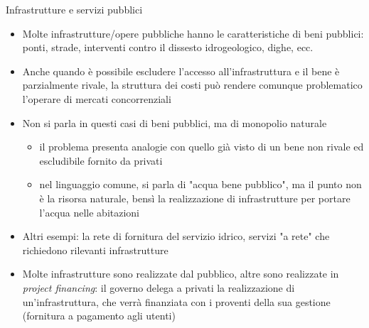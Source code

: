 \documentclass[aspectratio=149,11pt]{beamer}
\begin{document}
\begin{frame}{Infrastrutture e servizi pubblici}
\begin{itemize}
\item Molte infrastrutture/opere pubbliche hanno le caratteristiche di beni
pubblici: ponti, strade, interventi contro il dissesto idrogeologico, dighe,
ecc.
\item Anche quando è possibile escludere l'accesso all'infrastruttura e il bene è
parzialmente rivale, la struttura dei costi può rendere comunque problematico
l'operare di mercati concorrenziali
\item Non si parla in questi casi di beni pubblici, ma di \alert{monopolio naturale}
\begin{itemize}
\item il problema presenta analogie con quello già visto di un bene non rivale
ed escludibile fornito da privati
\item nel linguaggio comune, si parla di "acqua bene pubblico", ma il punto non
è la risorsa naturale, bensì la realizzazione di infrastrutture per
portare l'acqua nelle abitazioni
\end{itemize}
\item Altri esempi: la rete di fornitura del servizio idrico, servizi "a rete" che
richiedono rilevanti infrastrutture
\item Molte infrastrutture sono realizzate dal pubblico, altre sono realizzate in
\emph{project financing}: il governo delega a privati la realizzazione di
un'infrastruttura, che verrà finanziata con i proventi della sua gestione
(fornitura a pagamento agli utenti)
\end{itemize}
\end{frame}
\end{document}
